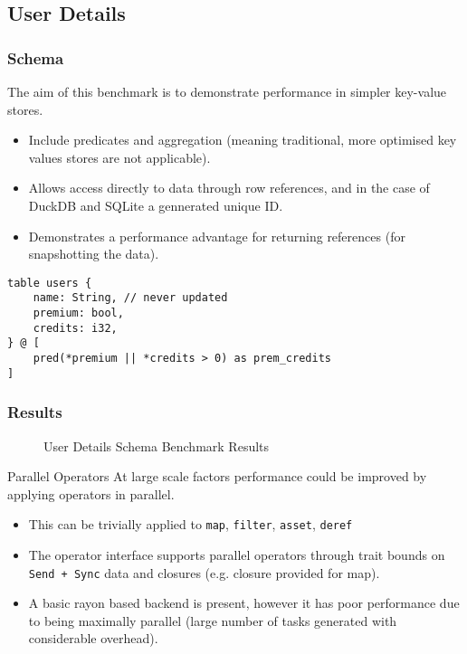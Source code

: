 \subsection{User Details}
\subsubsection{Schema}
The aim of this benchmark is to demonstrate performance in simpler key-value stores.
\begin{itemize}
    \setlength\itemsep{0em}
    \item Include predicates and aggregation (meaning traditional, more optimised key values stores are not applicable).
    \item Allows access directly to data through row references, and in the case of DuckDB and SQLite a gennerated unique ID.
    \item Demonstrates a performance advantage for returning references (for snapshotting the data).
\end{itemize}
\begin{verbatim}
table users {
    name: String, // never updated
    premium: bool,
    credits: i32,
} @ [
    pred(*premium || *credits > 0) as prem_credits
]
\end{verbatim}
\subsubsection{Results}
\begin{figure}[h!]
    \centering
    \vspace{-0.4em}
    \resizebox{\textwidth}{!}{}
    \resizebox{\textwidth}{!}{}
    \caption{User Details Schema Benchmark Results}
    \label{fig:sales_analysis_access_queries}
\end{figure}

\begin{futurebox}{Parallel Operators}
    At large scale factors performance could be improved by applying operators in parallel.
    \begin{itemize}
        \setlength\itemsep{0em}
        \item This can be trivially applied to \texttt{map}, \texttt{filter}, \texttt{asset}, \texttt{deref}
        \item The operator interface supports parallel operators through trait bounds on \texttt{Send + Sync} data and closures (e.g. closure provided for map).
        \item A basic rayon\cite{RayonExplainer} based backend is present, however it has poor performance due to being maximally parallel (large number of tasks generated with considerable overhead).
    \end{itemize}
\end{futurebox}


